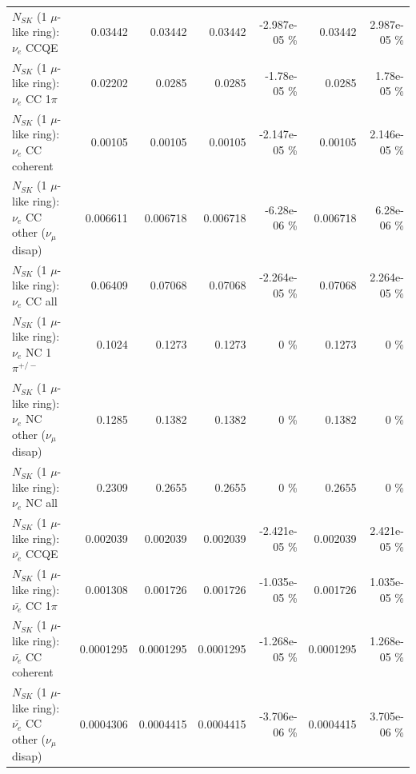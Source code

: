 \begin{table}
\begin{tabular}{| l | r | r | r  r | r  r |}
\hline
\hline
\hline
                                      $N_{SK}$ (1 $\mu$-like ring): $\nu_e$ CCQE &         0.03442 &         0.03442 &         0.03442 & -2.987e-05 \%  &         0.03442 & 2.987e-05 \%  \\ 
                                 $N_{SK}$ (1 $\mu$-like ring): $\nu_e$ CC 1$\pi$ &         0.02202 &          0.0285 &          0.0285 & -1.78e-05 \%  &          0.0285 & 1.78e-05 \%  \\ 
                               $N_{SK}$ (1 $\mu$-like ring): $\nu_e$ CC coherent &         0.00105 &         0.00105 &         0.00105 & -2.147e-05 \%  &         0.00105 & 2.146e-05 \%  \\ 
                $N_{SK}$ (1 $\mu$-like ring): $\nu_e$ CC other ($\nu_\mu$ disap) &        0.006611 &        0.006718 &        0.006718 & -6.28e-06 \%  &        0.006718 & 6.28e-06 \%  \\ 
                                  $N_{SK}$ (1 $\mu$-like ring): $\nu_{e}$ CC all &         0.06409 &         0.07068 &         0.07068 & -2.264e-05 \%  &         0.07068 & 2.264e-05 \%  \\ 
\hline
                           $N_{SK}$ (1 $\mu$-like ring): $\nu_e$ NC 1$\pi^{+/-}$ &          0.1024 &          0.1273 &          0.1273 &        0 \%  &          0.1273 &        0 \%  \\ 
                $N_{SK}$ (1 $\mu$-like ring): $\nu_e$ NC other ($\nu_\mu$ disap) &          0.1285 &          0.1382 &          0.1382 &        0 \%  &          0.1382 &        0 \%  \\ 
                                  $N_{SK}$ (1 $\mu$-like ring): $\nu_{e}$ NC all &          0.2309 &          0.2655 &          0.2655 &        0 \%  &          0.2655 &        0 \%  \\ 
\hline
\hline
\hline
                                $N_{SK}$ (1 $\mu$-like ring): $\bar{\nu_e}$ CCQE &        0.002039 &        0.002039 &        0.002039 & -2.421e-05 \%  &        0.002039 & 2.421e-05 \%  \\ 
                           $N_{SK}$ (1 $\mu$-like ring): $\bar{\nu_e}$ CC 1$\pi$ &        0.001308 &        0.001726 &        0.001726 & -1.035e-05 \%  &        0.001726 & 1.035e-05 \%  \\ 
                         $N_{SK}$ (1 $\mu$-like ring): $\bar{\nu_e}$ CC coherent &       0.0001295 &       0.0001295 &       0.0001295 & -1.268e-05 \%  &       0.0001295 & 1.268e-05 \%  \\ 
          $N_{SK}$ (1 $\mu$-like ring): $\bar{\nu_e}$ CC other ($\nu_\mu$ disap) &       0.0004306 &       0.0004415 &       0.0004415 & -3.706e-06 \%  &       0.0004415 & 3.705e-06 \%  \\ 

\end{tabular}
\end{table}
